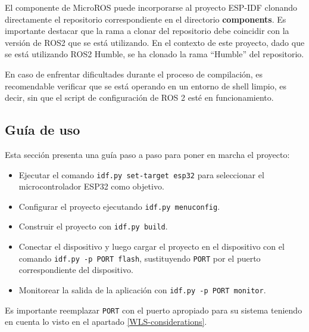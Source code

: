 El componente de MicroROS puede incorporarse al proyecto ESP-IDF clonando directamente el repositorio correspondiente en el directorio \textbf{components}. Es importante destacar que la rama a clonar del repositorio debe coincidir con la versión de ROS2 que se está utilizando. En el contexto de este proyecto, dado que se está utilizando ROS2 Humble, se ha clonado la rama ``Humble'' del repositorio.



En caso de enfrentar dificultades durante el proceso de compilación, es recomendable verificar que se está operando en un entorno de shell limpio, es decir, sin que el script de configuración de ROS 2 esté en funcionamiento.

\subsection{Guía de uso}
\label{subseccion:usageespidf}
Esta sección presenta una guía paso a paso para poner en marcha el proyecto:

\begin{itemize}
\item Ejecutar el comando \texttt{idf.py set-target esp32} para seleccionar el microcontrolador ESP32 como objetivo.
\item Configurar el proyecto ejecutando \texttt{idf.py menuconfig}.
\item Construir el proyecto con \texttt{idf.py build}.
\item Conectar el dispositivo y luego cargar el proyecto en el dispositivo con el comando \texttt{idf.py -p PORT flash}, sustituyendo \texttt{PORT} por el puerto correspondiente del dispositivo.
\item Monitorear la salida de la aplicación con \texttt{idf.py -p PORT monitor}.
\end{itemize}

Es importante reemplazar \texttt{PORT} con el puerto apropiado para su sistema teniendo en cuenta lo visto en el apartado \ref{WLS-considerations}.

